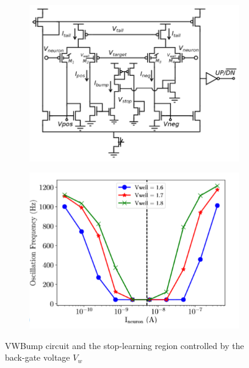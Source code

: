\documentclass[main]{subfiles}
\begin{document}
%
\begin{figure}
     \centering
     \begin{subfigure}[b]{0.47\textwidth}
        \centering
        \includegraphics[width=\textwidth]{12_NeuromorphicSystems2/figures/vwbump.PNG}
        \caption{}
        \label{fig:v_max}
     \end{subfigure}
     \hfill
     \begin{subfigure}[b]{0.47\textwidth}
         \centering
        \includegraphics[width=\textwidth]{12_NeuromorphicSystems2/figures/dead.PNG}
        \caption{}
        \label{fig:ex2_epsc_max}
     \end{subfigure}
        \caption{VWBump circuit and the stop-learning region controlled by the back-gate voltage $V_w$}
        \label{fig:ex2_1}
\end{figure}
%
\end{document}
